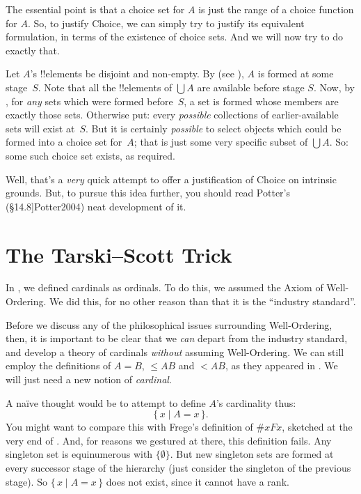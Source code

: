 \documentclass[10pt,a4paper]{article}
\makeatletter
\theoremstyle{plain}
\theoremstyle{definition}
\theoremstyle{remark}
\newcommand*{\olfileid}[3]{}
\newcommand*{\olsection}[1]{\section*{#1}}
\newcommand{\olref}{\@ifnextchar[{\olref@i}{\olref@final}}
\def\olref@i[#1]{\@ifnextchar[{\olref@ii}{\olref@final}}
\def\olref@ii[#1]{\@ifnextchar[{\olref@iii}{\olref@final}}
\def\olref@iii[#1]{\olref@final}
\def\olref@final#1{\ref{#1}}
\providecommand{\cardle}{\leq}
\providecommand{\Setabs}[2]{\{\, #1 \mid #2 \,\}}
\providecommand{\citeyear}[1]{\cite{#1}}
\providecommand{\cardless}{<}
\providecommand{\cardeq}[2]{#1 = #2}
\makeatother
\begin{document}
The essential point is that a choice set for $A$ is just the range of
a choice function for $A$. So, to justify Choice, we can simply try to
justify its equivalent formulation, in terms of the existence of
choice sets. And we will now try to do exactly that. 

Let $A$'s !!{element}s be disjoint and non-empty. By \stageshier{}
(see \olref[z][story]{sec}), $A$ is formed at some stage~$S$. Note
that all the !!{element}s of $\bigcup A$ are available before stage
$S$. Now, by \stagesacc{}, for \emph{any} sets which were formed
before~$S$, a set is formed whose members are exactly those sets.
Otherwise put: every \emph{possible} collections of earlier-available
sets will exist at~$S$. But it is certainly \emph{possible} to select
objects which could be formed into a choice set for~$A$; that is just
some very specific subset of $\bigcup A$. So: some such choice set
exists, as required.

Well, that's a \emph{very} quick attempt to offer a justification of
Choice on intrinsic grounds. But, to pursue this idea further, you
should read Potter's (\citeyear[\S14.8]{Potter2004}) neat development
of it.



\olfileid{sth}{choice}{tarskiscott}
\olsection{The Tarski--Scott Trick}

In \olref[cardinals][cardsasords]{defcardinalasordinal}, we
defined cardinals as ordinals. To do this, we assumed the Axiom of
Well-Ordering. We did this, for no other reason than that it is the
``industry standard''.

Before we discuss any of the philosophical issues surrounding
Well-Ordering, then, it is important to be clear that we \emph{can}
depart from the industry standard, and develop a theory of cardinals
\emph{without} assuming Well-Ordering. We can still employ the
definitions of $\cardeq{A}{B}$, $\cardle{A}{B}$ and $\cardless{A}{B}$,
as they appeared in \olref[sfr][siz][]{chap}. We will just need a new
notion of \emph{cardinal}.

A na\"ive thought would be to attempt to define $A$'s cardinality thus:
\[
	\Setabs{x}{\cardeq{A}{x}}.
\]
You might want to compare this with Frege's definition of $\# x Fx$,
sketched at the very end of \olref[cardinals][hp]{sec}. And, for
reasons we gestured at there, this definition fails. Any singleton set
is equinumerous with $\{\emptyset\}$. But new singleton sets are
formed at every successor stage of the hierarchy (just consider the
singleton of the previous stage). So $\Setabs{x}{\cardeq{A}{x}}$ does
not exist, since it cannot have a rank.
\end{document}
